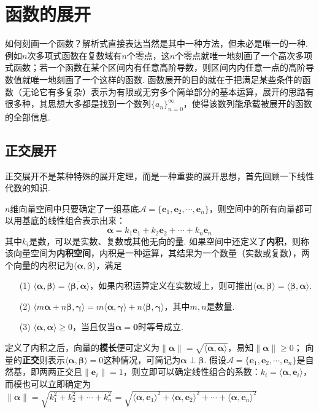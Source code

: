 \documentclass[main.tex]{subfiles}
\begin{document}
\section{函数的展开}

如何刻画一个函数？解析式直接表达当然是其中一种方法，但未必是唯一的一种. 例如\(n\)次多项式函数在复数域有\(n\)个零点，这\(n\)个零点就唯一地刻画了一个高次多项式函数；若一个函数在某个区间内有任意高阶导数，则区间内内任意一点的高阶导数值就唯一地刻画了一个这样的函数. 函数展开的目的就在于把满足某些条件的函数（无论它有多复杂）表示为有限或无穷多个简单部分的基本运算，展开的思路有很多种，其思想大多都是找到一个数列\(\{a_n\}_{n=0}^{\infty}\)，使得该数列能承载被展开的函数的全部信息.

\subsection{正交展开}

正交展开不是某种特殊的展开定理，而是一种重要的展开思想，首先回顾一下线性代数的知识.

\begin{reference}
    \(n\)维向量空间中只要确定了一组基底\(\mathcal{A} = \{\bm{e}_1, \bm{e}_2, \cdots, \bm{e}_n\}\)，则空间中的所有向量都可以用基底的线性组合表示出来：
    \[\bm{\alpha} = k_1\bm{e}_1+k_2\bm{e}_2+\cdots+k_n\bm{e}_n\]
    其中\(k_i\)是数，可以是实数、复数或其他无向的量.
    \newline
    如果空间中还定义了\textbf{内积}，则称该向量空间为\textbf{内积空间}，内积是一种运算，其结果为一个数量（实数或复数），两个向量的内积记为\(\langle \bm{\alpha},\bm{\beta} \rangle\)，满足
    \begin{itemize}
        \item [(1)] \(\langle \bm{\alpha},\bm{\beta} \rangle = \overline{\langle \bm{\beta},\bm{\alpha} \rangle}\)，如果内积运算定义在实数域上，则可推出\(\langle \bm{\alpha},\bm{\beta} \rangle = \langle \bm{\beta},\bm{\alpha} \rangle\).
        \item [(2)] \(\langle m\bm{\alpha}+n\bm{\beta},\bm{\gamma} \rangle = m\langle \bm{\alpha},\bm{\gamma} \rangle + n\langle \bm{\beta},\bm{\gamma} \rangle\)，其中\(m,n\)是数量.
        \item [(3)] \(\langle \bm{\alpha},\bm{\alpha} \rangle \geq 0\)，当且仅当\(\bm{\alpha}=\bm{0}\)时等号成立.
    \end{itemize}
    定义了内积之后，向量的\textbf{模长}便可定义为\(\|\bm{\alpha}\|=\sqrt{\langle \bm{\alpha},\bm{\alpha} \rangle}\)，易知\(\|\bm{\alpha}\| \geq 0\)；
    \newline
    向量的\textbf{正交}则表示\(\langle \bm{\alpha},\bm{\beta} \rangle=0\)这种情况，可简记为\(\bm{\alpha} \perp \bm{\beta}\).
    \newline
    假设\(\mathcal{A}=\{\bm{e}_1, \bm{e}_2, \cdots, \bm{e}_n\}\)是自然基，即两两正交且\(\|\bm{e}_i\|=1\)，则立即可以确定线性组合的系数：\(k_i = \langle\bm{\alpha},\bm{e}_i\rangle\)，而模也可以立即确定为\(\|\bm{\alpha}\| = \sqrt{k_1^2+k_2^2+\cdots+k_n^2} = \sqrt{\langle\bm{\alpha},\bm{e}_1\rangle^2+\langle\bm{\alpha},\bm{e}_2\rangle^2+\cdots+\langle\bm{\alpha},\bm{e}_n\rangle^2}\)
\end{reference}
\end{document}
